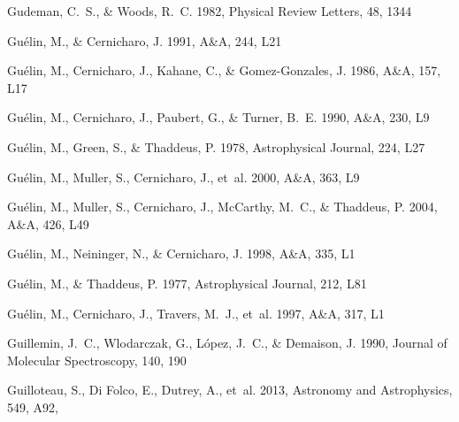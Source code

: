 \documentclass[twocolumn]{aastex631}
\begin{document}
\begin{thebibliography}{}
Gudeman, C.~S., \& Woods, R.~C. 1982, Physical Review Letters, 48, 1344

Gu{\'e}lin, M., \& Cernicharo, J. 1991, A{\&}A, 244, L21

Gu{\'e}lin, M., Cernicharo, J., Kahane, C., \& Gomez-Gonzales, J. 1986, A{\&}A,
  157, L17

Gu{\'e}lin, M., Cernicharo, J., Paubert, G., \& Turner, B.~E. 1990, A{\&}A,
  230, L9

Gu{\'e}lin, M., Green, S., \& Thaddeus, P. 1978, Astrophysical Journal, 224,
  L27

Gu{\'e}lin, M., Muller, S., Cernicharo, J., {et~al.} 2000, A{\&}A, 363, L9

Gu{\'e}lin, M., Muller, S., Cernicharo, J., McCarthy, M.~C., \& Thaddeus, P.
  2004, A{\&}A, 426, L49

Gu{\'e}lin, M., Neininger, N., \& Cernicharo, J. 1998, A{\&}A, 335, L1

Gu{\'e}lin, M., \& Thaddeus, P. 1977, Astrophysical Journal, 212, L81

Gu{\'e}lin, M., Cernicharo, J., Travers, M.~J., {et~al.} 1997, A{\&}A, 317, L1

Guillemin, J.~C., Wlodarczak, G., L{\'o}pez, J.~C., \& Demaison, J. 1990,
  Journal of Molecular Spectroscopy, 140, 190

{Guilloteau}, S., {Di Folco}, E., {Dutrey}, A., {et~al.} 2013, Astronomy and
  Astrophysics, 549, A92, 


\end{thebibliography}
\end{document}
